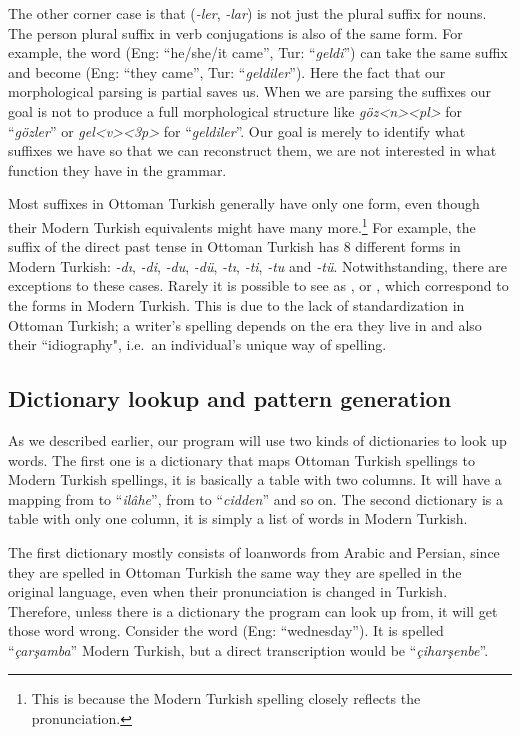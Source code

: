 \documentclass[10pt,twocolumn]{article}
\theoremstyle{nonumberplain}
\newcommand{\otto}[1]{\RLE{\ottoman{}\Large{}#1}}
\newcommand{\word}[1]{``\emph{#1}''}
\begin{document}

The other corner case is that \otto{-لر} (\emph{-ler}, \emph{-lar}) is not just
the plural suffix for nouns. The  person plural suffix in verb
conjugations is also of the same form. For example, the word \otto{گلدى} (Eng: ``he/she/it came'', Tur: \word{geldi}) can take the same suffix and become \otto{گلديلر} (Eng: ``they came'', Tur: \word{geldiler}).
Here the fact that our morphological parsing is partial saves us.
When we are parsing the suffixes our goal is not to produce a full
morphological structure like \emph{göz<n><pl>} for \word{gözler} or
\emph{gel<v><3p>} for \word{geldiler}. Our goal is merely to identify what
suffixes we have so that we can reconstruct them, we are not interested in what
function they have in the grammar.

Most suffixes in Ottoman Turkish generally have only one form, even though their Modern Turkish equivalents might have many more.\footnote{This is because the Modern Turkish spelling closely reflects the pronunciation.} For example, the suffix of the direct past tense \otto{-دى} in Ottoman Turkish has 8 different forms in Modern Turkish:
\emph{-dı}, \emph{-di}, \emph{-du}, \emph{-dü}, \emph{-tı}, \emph{-ti}, \emph{-tu} and \emph{-tü}.
Notwithstanding, there are exceptions to these cases. Rarely it is possible to
see \otto{-دى} as \otto{-دو}, \otto{-تى} or \otto{-تو}, which correspond to the
forms in Modern Turkish. This is due to the lack of standardization in Ottoman
Turkish; a writer's spelling depends on the era they live in and also their
``idiography", i.e.\ an individual's unique way of spelling.

\subsection{Dictionary lookup and pattern generation}

As we described earlier, our program will use two kinds of dictionaries to look
up words. The first one is a dictionary that maps Ottoman Turkish spellings to
Modern Turkish spellings, it is basically a table with two columns.
It will have a mapping from \otto{الهه} to \word{ilâhe}, from \otto{جدا} to
\word{cidden} and so on. The second dictionary is a table with only one column,
it is simply a list of words in Modern Turkish.

The first dictionary mostly consists of loanwords from Arabic and Persian, since
they are spelled in Ottoman Turkish the same way they are spelled in the
original language, even when their pronunciation is changed in Turkish.
Therefore, unless there is a dictionary the program can look up from, it will
get those word wrong.
Consider the word \otto{چهارشنبه} (Eng: ``wednesday''). It is spelled
\word{çarşamba} Modern Turkish, but a direct transcription would be
\word{çiharşenbe}.
\end{document}
